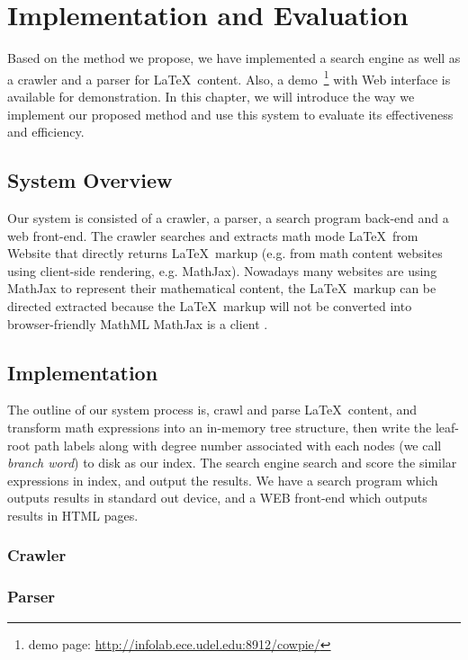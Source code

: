 \chapter{Implementation and Evaluation}
Based on the method we propose, we have implemented a search engine as well as a crawler and a parser for \LaTeX\ content. Also, a demo~\footnote{demo page: \url{http://infolab.ece.udel.edu:8912/cowpie/}} with Web interface is available for demonstration. 
In this chapter, we will introduce the way we implement our proposed method and use this system to evaluate its effectiveness and efficiency.

\section{System Overview}
Our system is consisted of a crawler, a parser, a search program back-end and a web front-end. The crawler searches and extracts math mode \LaTeX\ from Website that directly returns \LaTeX\ markup (e.g. from math content websites using client-side rendering, e.g. MathJax). 
Nowadays many websites are using MathJax to represent their mathematical content, the \LaTeX\ markup can be directed extracted because the \LaTeX\ markup will not be converted into browser-friendly MathML MathJax is a client . 

\section{Implementation}
The outline of our system process is, crawl and parse \LaTeX\ content, and transform math expressions into an in-memory tree structure, then write the leaf-root path labels along with degree number associated with each nodes (we call \textit{branch word}) to disk as our index. 
The search engine search and score the similar expressions in index, and output the results. 
We have a search program which outputs results in standard out device, and a WEB front-end which outputs results in HTML pages.

\subsection{Crawler}
\subsection{Parser}

